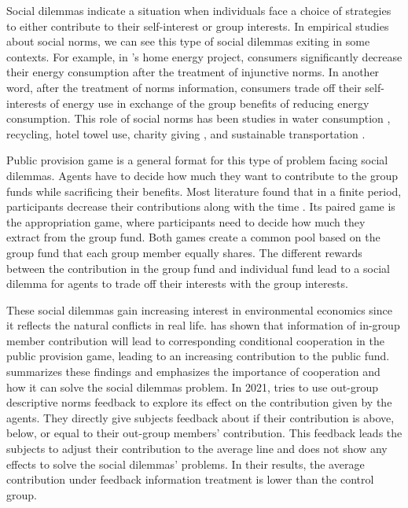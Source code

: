 \documentclass[12pt]{article}
\begin{document}
Social dilemmas indicate a situation when individuals face a choice of strategies to either contribute to their self-interest or group interests. In empirical studies about social norms, we can see this type of social dilemmas exiting in some contexts. For example, in \cite{allcott2014short} ’s home energy project, consumers significantly decrease their energy consumption after the treatment of injunctive norms. In another word, after the treatment of norms information, consumers trade off their self-interests of energy use in exchange of the group benefits of reducing energy consumption. This role of social norms has been studies in water consumption \citep{ferraro2011persistence,ferraro2013using, torres2018direct}, recycling\citep{schultz1999changing}, hotel towel use\citep{goldstein2008room}, charity giving \citep{croson2008impact,krupka2016differential}, and sustainable transportation \citep{kormos2015influence}. 

Public provision game is a general format for this type of problem facing social dilemmas. Agents have to decide how much they want to contribute to the group funds while sacrificing their benefits. Most literature found that in a finite period, participants decrease their contributions along with the time \citep{fischbacher2010social,kandul2021public}. Its paired game is the appropriation game, where participants need to decide how much they extract from the group fund. Both games create a common pool based on the group fund that each group member equally shares. The different rewards between the contribution in the group fund and individual fund lead to a social dilemma for agents to trade off their interests with the group interests. 

These social dilemmas gain increasing interest in environmental economics since it reflects the natural conflicts in real life. \cite{fischbacher2001people} has shown that information of in-group member contribution will lead to corresponding conditional cooperation in the public provision game, leading to an increasing contribution to the public fund. \cite{fehr2018normative} summarizes these findings and emphasizes the importance of cooperation and how it can solve the social dilemmas problem. In 2021,  \cite{kandul2021public} tries to use out-group descriptive norms feedback to explore its effect on the contribution given by the agents. They directly give subjects feedback about if their contribution is above, below, or equal to their out-group members' contribution. This feedback leads the subjects to adjust their contribution to the average line and does not show any effects to solve the social dilemmas' problems.  In their results, the average contribution under feedback information treatment is lower than the control group. 
\end{document}
